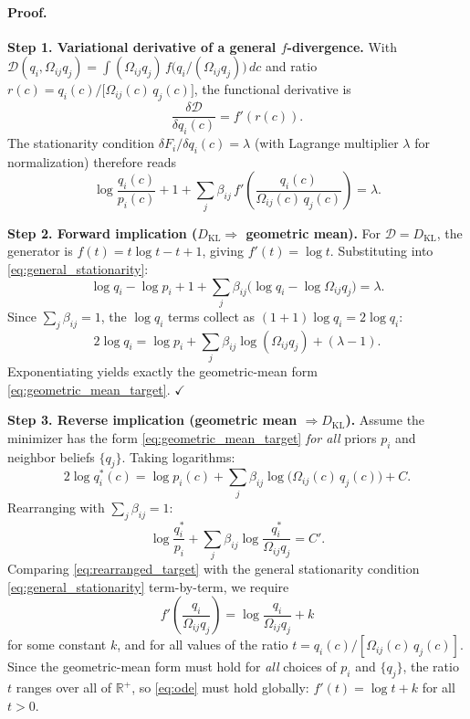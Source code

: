 \documentclass[twoside,11pt]{article}
\begin{document}
\paragraph{Proof.}

\textbf{Step 1.  Variational derivative of a general $f$-divergence.}
With $\mathcal{D}(q_i,\Omega_{ij}q_j)=\int (\Omega_{ij}q_j)\,f\!\bigl(q_i/(\Omega_{ij}q_j)\bigr)\,dc$ and ratio $r(c)=q_i(c)/\bigl[\Omega_{ij}(c)\,q_j(c)\bigr]$, the functional derivative is
\begin{equation}
\frac{\delta\mathcal{D}}{\delta q_i(c)} = f'(r(c)).
\end{equation}
The stationarity condition $\delta F_i/\delta q_i(c)=\lambda$ (with Lagrange multiplier $\lambda$ for normalization) therefore reads
\begin{equation}
\log\frac{q_i(c)}{p_i(c)} + 1
+ \sum_j \beta_{ij}\,f'\!\!\left(\frac{q_i(c)}{\Omega_{ij}(c)\,q_j(c)}\right) = \lambda.
\label{eq:general_stationarity}
\end{equation}

\textbf{Step 2.  Forward implication ($D_{\mathrm{KL}}\Rightarrow$ geometric mean).}
For $\mathcal{D}=D_{\mathrm{KL}}$, the generator is $f(t)=t\log t - t + 1$, giving $f'(t)=\log t$.  Substituting into \eqref{eq:general_stationarity}:
\[
\log q_i - \log p_i + 1 + \sum_j \beta_{ij}\bigl(\log q_i - \log\Omega_{ij}q_j\bigr) = \lambda.
\]
Since $\sum_j\beta_{ij}=1$, the $\log q_i$ terms collect as $(1+1)\log q_i = 2\log q_i$:
\[
2\log q_i = \log p_i + \sum_j\beta_{ij}\log(\Omega_{ij}q_j) + (\lambda - 1).
\]
Exponentiating yields exactly the geometric-mean form \eqref{eq:geometric_mean_target}. \hfill $\checkmark$

\textbf{Step 3.  Reverse implication (geometric mean $\Rightarrow D_{\mathrm{KL}}$).}
Assume the minimizer has the form \eqref{eq:geometric_mean_target} \emph{for all} priors $p_i$ and neighbor beliefs $\{q_j\}$.  Taking logarithms:
\begin{equation}
2\log q_i^*(c) = \log p_i(c) + \sum_j\beta_{ij}\log\bigl(\Omega_{ij}(c)\,q_j(c)\bigr) + C.
\label{eq:log_target}
\end{equation}
Rearranging with $\sum_j\beta_{ij}=1$:
\begin{equation}
\log\frac{q_i^*}{p_i} + \sum_j\beta_{ij}\log\frac{q_i^*}{\Omega_{ij}q_j} = C'.
\label{eq:rearranged_target}
\end{equation}
Comparing \eqref{eq:rearranged_target} with the general stationarity condition \eqref{eq:general_stationarity} term-by-term, we require
\begin{equation}
f'\!\!\left(\frac{q_i}{\Omega_{ij}q_j}\right) = \log\frac{q_i}{\Omega_{ij}q_j} + k
\label{eq:ode}
\end{equation}
for some constant $k$, and for all values of the ratio $t = q_i(c)/[\Omega_{ij}(c)\,q_j(c)]$.  Since the geometric-mean form must hold for \emph{all} choices of $p_i$ and $\{q_j\}$, the ratio $t$ ranges over all of $\mathbb{R}^+$, so \eqref{eq:ode} must hold globally: $f'(t)=\log t + k$ for all $t>0$.
\end{document}
